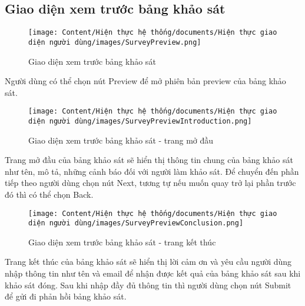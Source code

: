 \subsection{Giao diện xem trước bảng khảo sát}

\begin{figure}[H]
    \centering
    \texttt{[image: Content/Hiện thực hệ thống/documents/Hiện thực giao diện người dùng/images/SurveyPreview.png]}
    \vspace{0.5cm}
    \caption{Giao diện xem trước bảng khảo sát}
    \label{fig: Giao diện xem trước bảng khảo sát}
\end{figure}

Người dùng có thể chọn nút Preview để mở phiên bản preview của bảng khảo sát.

\begin{figure}[H]
    \centering
    \texttt{[image: Content/Hiện thực hệ thống/documents/Hiện thực giao diện người dùng/images/SurveyPreviewIntroduction.png]}
    \vspace{0.5cm}
    \caption{Giao diện xem trước bảng khảo sát - trang mở đầu}
    \label{fig: Giao diện xem trước bảng khảo sát - trang mở đầu}
\end{figure}

Trang mở đầu của bảng khảo sát sẽ hiển thị thông tin chung của bảng khảo sát như tên, mô tả, những cảnh báo đối với người làm khảo sát. Để chuyển đến phần tiếp theo người dùng chọn nút Next, tương tự nếu muốn quay trở lại phần trước đó thì có thể chọn Back.

\begin{figure}[H]
    \centering
    \texttt{[image: Content/Hiện thực hệ thống/documents/Hiện thực giao diện người dùng/images/SurveyPreviewConclusion.png]}
    \vspace{0.5cm}
    \caption{Giao diện xem trước bảng khảo sát - trang kết thúc}
    \label{fig: Giao diện xem trước bảng khảo sát - trang kết thúc}
\end{figure}

Trang kết thúc của bảng khảo sát sẽ hiển thị lời cảm ơn và yêu cầu người dùng nhập thông tin như tên và email để nhận được kết quả của bảng khảo sát sau khi khảo sát đóng. Sau khi nhập đầy đủ thông tin thì người dùng chọn nút Submit để gửi đi phản hồi bảng khảo sát.